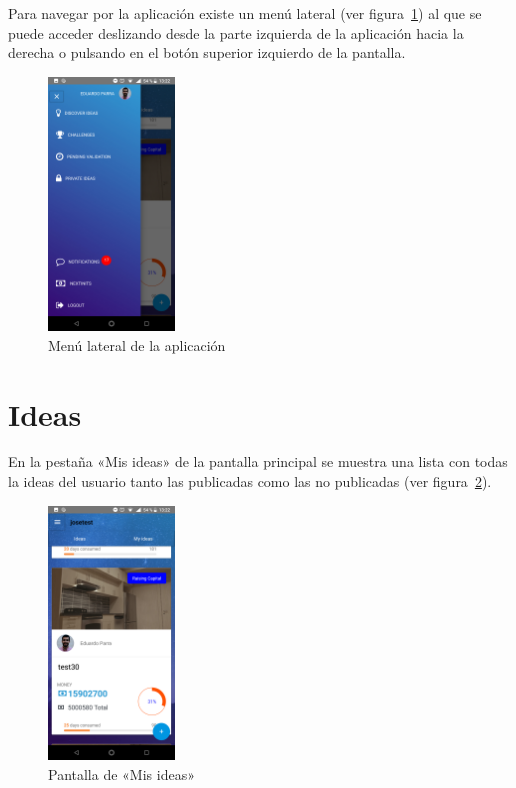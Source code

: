 Para navegar por la aplicación existe un menú lateral (ver figura~\ref{fig:menu_admin}) al que 
se puede acceder deslizando desde la parte izquierda de la aplicación hacia la derecha o pulsando 
en el botón superior izquierdo de la pantalla.

\begin{figure}[!h]
	\begin{center}
		\includegraphics[width=0.3\textwidth]{./img/anexo1/menu_admin.png}
		\caption{Menú lateral de la aplicación}
		\label{fig:menu_admin}
	\end{center}
\end{figure}

\section{Ideas}

En la pestaña «Mis ideas» de la pantalla principal se muestra una lista con todas la ideas del usuario 
tanto las publicadas como las no publicadas (ver figura~\ref{fig:inicio_mis_ideas}).

\begin{figure}[!h]
	\begin{center}
		\includegraphics[width=0.3\textwidth]{./img/anexo1/inicio_mis_ideas.png}
		\caption{Pantalla de «Mis ideas»}
		\label{fig:inicio_mis_ideas}
	\end{center}
\end{figure}

